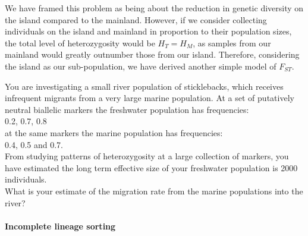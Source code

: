 We have framed this problem as being about the reduction in genetic diversity on the island compared to the mainland. However, if we consider collecting individuals on the island and mainland in proportion to their population
sizes, the total level of heterozygosity would be $H_T=H_M$, as samples from our mainland would greatly outnumber those from our island. Therefore, considering the island as our sub-population, we have derived another simple model of $F_{ST}$.

\begin{question}
You are investigating a small river population of sticklebacks, which receives infrequent migrants from a very large marine population. At a set of putatively neutral biallelic markers the freshwater population has frequencies:\\
0.2, 0.7, 0.8\\
at the same markers the marine population has frequencies:\\
0.4, 0.5 and 0.7.\\
 From studying patterns of heterozygosity at a large collection of markers, you have estimated the long term effective size of your freshwater population is 2000 individuals.\\
What is your estimate of the migration rate from the marine
populations into the river?
\end{question}

\paragraph{Incomplete lineage sorting}

